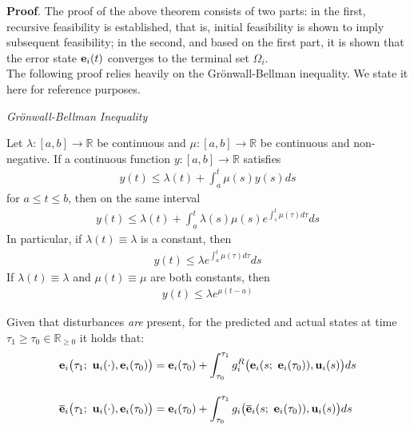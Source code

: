 \textbf{Proof}. The proof of the above theorem consists of two parts:
in the first, recursive feasibility is established, that is, initial
feasibility is shown to imply subsequent feasibility; in the second, and based
on the first part, it is shown that the error state $\bm{\mathbf{e}}_i(t)$ converges
to the terminal set $\Omega_i$.\\[2.5ex]

The following proof relies heavily on the Gr\"{o}nwall-Bellman inequality.
We state it here for reference purposes.
\begin{bw_box}
  \begin{lemma} \cite{khalil_nonlinear_systems} \textit{Gr\"{o}nwall-Bellman Inequality}

    Let $\lambda : [a,b] \to \mathbb{R}$ be continuous and
    $\mu : [a,b] \to \mathbb{R}$ be continuous and non-negative. If a
    continuous function $y : [a,b] \to \mathbb{R}$ satisfies
    \begin{align}
      y(t) \leq \lambda(t) + \int_a^t \mu(s) y(s) ds
    \end{align}
    for $a \leq t \leq b$, then on the same interval
    \begin{align}
      y(t) \leq \lambda(t) + \int_a^t \lambda(s) \mu(s) e^{\int_s^t \mu(\tau)d\tau} ds
    \end{align}
    In particular, if $\lambda(t) \equiv \lambda$ is a constant, then
    \begin{align}
      y(t) \leq \lambda e^{\int_a^t \mu(\tau)d\tau} ds
    \end{align}
    If $\lambda(t) \equiv \lambda$ and $\mu(t) \equiv \mu$ are both constants,
    then
    \begin{align}
      y(t) \leq \lambda e^{\mu (t - a)}
    \end{align}
    \label{lemma:bellman_inequality}
  \end{lemma}
\end{bw_box}

\begin{bw_box}
  \begin{remark}
    Given that disturbances \textit{are} present, for the predicted and actual
    states at time $\tau_1 \geq \tau_0 \in \mathbb{R}_{\geq 0}$ it holds that:
    \begin{align}
      \bm{\mathbf{e}}_i\big(\tau_1;\ \bm{\mathbf{u}}_i(\cdot), \bm{\mathbf{e}}_i(\tau_0)\big) &=
        \bm{\mathbf{e}}_i(\tau_0) + \int_{\tau_0}^{\tau_1} g_i^R\big(\bm{\mathbf{e}}_i(s;\ \bm{\mathbf{e}}_i(\tau_0)), \bm{\mathbf{u}}_i(s)\big) ds \\[2.5ex]
      \overline{\bm{\mathbf{e}}}_i\big(\tau_1;\ \bm{\mathbf{u}}_i(\cdot), \bm{\mathbf{e}}_i(\tau_0)\big) &=
        \bm{\mathbf{e}}_i(\tau_0) + \int_{\tau_0}^{\tau_1} g_i\big(\overline{\bm{\mathbf{e}}}_i(s;\ \bm{\mathbf{e}}_i(\tau_0)), \bm{\mathbf{u}}_i(s)\big) ds
    \end{align}
    \label{remark:predicted_actual_equations_with_disturbance}
  \end{remark}
\end{bw_box}


